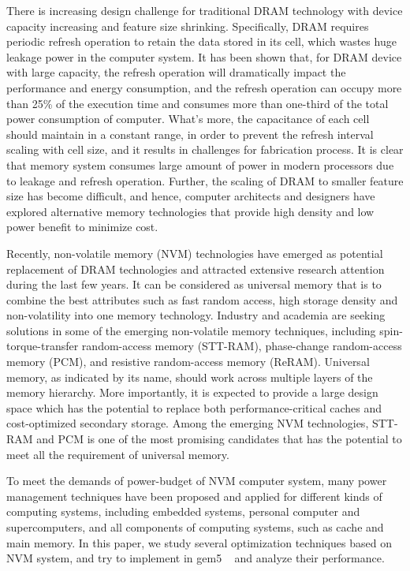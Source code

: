 


There is increasing design challenge for traditional DRAM technology with device capacity increasing and feature size shrinking. Specifically, DRAM requires periodic refresh operation to retain the data stored in its cell, which wastes huge leakage power in the computer system. It has been shown that, for DRAM device with large capacity, the refresh operation will dramatically impact the performance and energy consumption, and the refresh operation can occupy more than 25\% of the execution time and consumes more than one-third of the total power consumption of computer. What's more, the capacitance of each cell should maintain in a constant range,  in order to prevent the refresh interval scaling with cell size, and it results in challenges for fabrication process. It is clear that memory system consumes large amount of power in modern processors due to leakage and refresh operation. Further, the scaling of DRAM to smaller feature size has become difficult, and hence, computer architects and designers have explored alternative memory technologies that provide high density and low power benefit to minimize cost. 



Recently, non-volatile memory (NVM) technologies have emerged as potential replacement of DRAM technologies and attracted extensive research attention during the last few years. It can be considered as universal memory that is to combine the best attributes such as fast random access, high storage density and non-volatility into one memory technology. Industry and academia are seeking solutions in some of the emerging non-volatile memory techniques, including spin-torque-transfer random-access memory (STT-RAM), phase-change random-access memory (PCM), and resistive random-access memory (ReRAM). Universal memory, as indicated by its name, should work across multiple layers of the memory hierarchy. More importantly, it is expected to provide a large design space which has the potential to replace both performance-critical caches and cost-optimized secondary storage. Among the emerging NVM technologies, STT-RAM and PCM is one of the most promising candidates that has the potential to meet all the requirement of universal memory. 


To meet the demands of power-budget of NVM computer system, many power management techniques have been proposed and applied for different kinds of computing systems, including embedded systems, personal computer and supercomputers, and all components of computing systems, such as cache and main memory. In this paper, we study several optimization techniques based on NVM system, and try to implement in gem5 ~\cite{gem5} and analyze their performance.   



